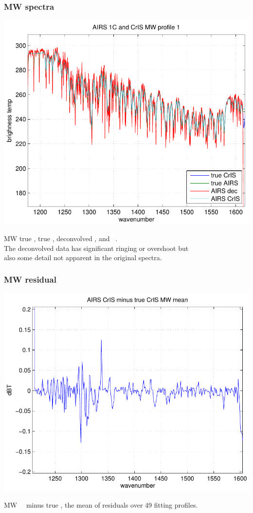 \documentclass[11pt]{beamer}
\begin{document}
\begin{frame}
\frametitle{MW spectra}

\begin{center}
  \includegraphics[scale=0.54]{figures/fig_1_MW.pdf}
\end{center}

MW true \cris, true \airs, deconvolved \airs, and \airs\ \cris.  \\
The deconvolved data has significant ringing or overshoot but \\
also some detail not apparent in the original spectra.

\end{frame}
\begin{frame}
\frametitle{MW residual}

\begin{center}
  \includegraphics[scale=0.54]{figures/fig_2_MW.pdf}
\end{center}

MW \airs\ \cris\ minus true \cris, the mean of residuals over 49
fitting profiles.

\end{frame}
\end{document}
